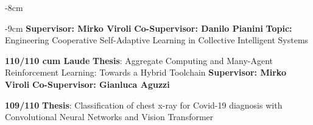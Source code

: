 \documentclass[10pt,a4paper]{altacv}
\begin{document}

    \begin{adjustwidth}{}{-8cm}
        \makecvheader
    \end{adjustwidth}

\begin{adjustwidth}{}{-9cm}
    \textbf{Supervisor: Mirko Viroli} \newline \textbf{Co-Supervisor: Danilo Pianini} \newline
    \textbf{Topic:} Engineering Cooperative Self-Adaptive Learning in Collective Intelligent Systems

    \divider

    \textbf{110/110 cum Laude} \newline
    \textbf{Thesis}: Aggregate Computing and Many-Agent Reinforcement Learning: Towards a Hybrid Toolchain \newline
    \textbf{Supervisor: Mirko Viroli} \newline \textbf{Co-Supervisor: Gianluca Aguzzi}

    \divider

    \textbf{109/110} \newline
    \textbf{Thesis}: Classification of chest x-ray for Covid-19 diagnosis with Convolutional Neural Networks and Vision Transformer


    \divider


    \divider

\end{adjustwidth}
\end{document}
